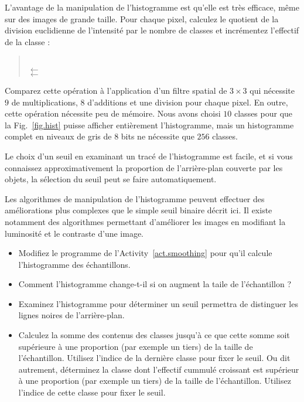 L'avantage de la manipulation de l'histogramme est qu'elle est très efficace, même sur des images de grande taille. Pour chaque pixel, calculez le quotient de la division euclidienne de l'intensité par le nombre de classes et incrémentez l'effectif de la classe :
\begin{quote}
\\
\hspace*{2em} $\leftarrow$ \\
\hspace*{2em} $\leftarrow$ 
\end{quote}
Comparez cette opération à l'application d'un filtre spatial de $3\times 3$ qui nécessite $9$ de multiplications, $8$ d'additions et une division pour chaque pixel. En outre, cette opération nécessite peu de mémoire. Nous avons choisi $10$ classes pour que la Fig.~\ref{fig.hist} puisse afficher entièrement l'histogramme, mais un histogramme complet en niveaux de gris de $8$ bits ne nécessite que $256$ classes.

Le choix d'un seuil en examinant un tracé de l'histogramme est facile, et si vous connaissez approximativement la proportion de l'arrière-plan couverte par les objets, la sélection du seuil peut se faire automatiquement.

Les algorithmes de manipulation de l'histogramme peuvent effectuer des améliorations plus complexes que le simple seuil binaire décrit ici. Il existe notamment des algorithmes permettant d'améliorer les images en modifiant la luminosité et le contraste d'une image. 

\begin{framed}
\begin{itemize}
\item Modifiez le programme de l'Activity~\ref{act.smoothing} pour qu'il calcule l'histogramme des échantillons.
\item Comment l'histogramme change-t-il si on augment la taile de l'échantillon ?
\item Examinez l'histogramme pour déterminer un seuil permettra de distinguer les lignes noires de l'arrière-plan.
\item Calculez la somme des contenus des classes jusqu'à ce que cette somme soit supérieure à une proportion (par exemple un tiers) de la taille de l'échantillon. Utilisez l'indice de la dernière classe pour fixer le seuil.
Ou dit autrement, déterminez la classe dont l'effectif cummulé croissant est supérieur à une proportion (par exemple un tiers) de la taille de l'échantillon. Utilisez l'indice de cette classe pour fixer le seuil.
\end{itemize}
\end{framed}

